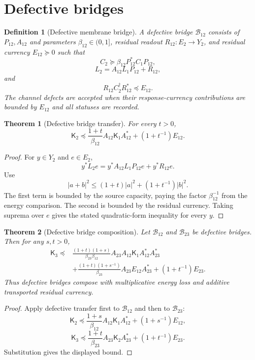 \documentclass[11pt]{article}
\newtheorem{theorem}{Theorem}
\newtheorem{definition}{Definition}
\newcommand{\K}{\mathsf K}
\newcommand{\suc}{\succeq}
\begin{document}
\section{Defective bridges}
\begin{definition}[Defective membrane bridge]
A defective bridge $\mathcal B_{12}$ consists of $P_{12},A_{12}$ and parameters $\beta_{12}\in(0,1]$, residual readout $R_{12}:E_2\to Y_2$, and residual currency $E_{12}\suc0$ such that
\[
C_2\suc \beta_{12}P_{12}^*C_1P_{12},
\]
\[
L_2=A_{12}L_1P_{12}+R_{12},
\]
and
\[
R_{12}C_2^\dagger R_{12}^*\preceq E_{12}.
\]
The channel defects are accepted when their response-currency contributions are bounded by $E_{12}$ and all statuses are recorded.
\end{definition}

\begin{theorem}[Defective bridge transfer]
For every $t>0$,
\[
\boxed{\;
\K_2\preceq \frac{1+t}{\beta_{12}}A_{12}\K_1A_{12}^*+(1+t^{-1})E_{12}.
\;}
\]
\end{theorem}

\begin{proof}
For $y\in Y_2$ and $e\in E_2$,
\[
y^*L_2e=y^*A_{12}L_1P_{12}e+y^*R_{12}e.
\]
Use
\[
|a+b|^2\le (1+t)|a|^2+(1+t^{-1})|b|^2.
\]
The first term is bounded by the source capacity, paying the factor $\beta_{12}^{-1}$ from the energy comparison.  The second is bounded by the residual currency.  Taking suprema over $e$ gives the stated quadratic-form inequality for every $y$.
\end{proof}

\begin{theorem}[Defective bridge composition]
Let $\mathcal B_{12}$ and $\mathcal B_{23}$ be defective bridges.  Then for any $s,t>0$,
\[
\boxed{
\begin{aligned}
\K_3\preceq{}&\frac{(1+t)(1+s)}{\beta_{23}\beta_{12}}
A_{23}A_{12}\K_1A_{12}^*A_{23}^*\\
&+\frac{(1+t)(1+s^{-1})}{\beta_{23}}A_{23}E_{12}A_{23}^*
+(1+t^{-1})E_{23}.
\end{aligned}}
\]
Thus defective bridges compose with multiplicative energy loss and additive transported residual currency.
\end{theorem}

\begin{proof}
Apply defective transfer first to $\mathcal B_{12}$ and then to $\mathcal B_{23}$:
\[
\K_2\preceq \frac{1+s}{\beta_{12}}A_{12}\K_1A_{12}^*+(1+s^{-1})E_{12},
\]
\[
\K_3\preceq \frac{1+t}{\beta_{23}}A_{23}\K_2A_{23}^*+(1+t^{-1})E_{23}.
\]
Substitution gives the displayed bound.
\end{proof}
\end{document}
